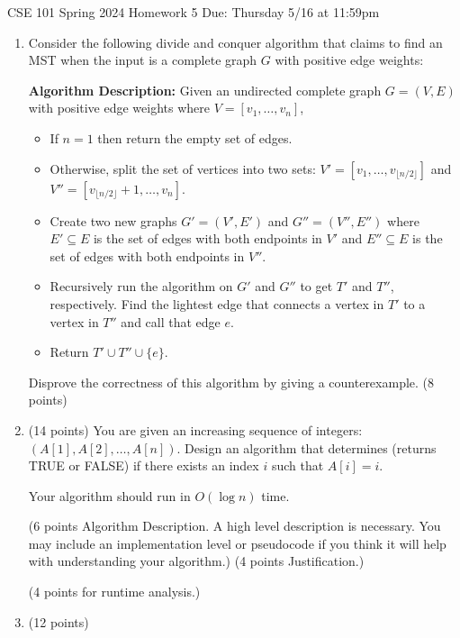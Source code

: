 \documentclass[10pt,letterpaper,unboxed,cm]{article}
\begin{document}
\hfill{CSE 101 Spring 2024}
\hfill{Homework 5 }
\hfill{Due: Thursday 5/16 at 11:59pm}






\begin{enumerate}

\item

Consider the following divide and conquer algorithm that claims to find an MST when the input is a complete graph $G$ with positive edge weights:

{\bf Algorithm Description:}
Given an undirected complete graph $G=(V,E)$ with positive edge weights where $V=[v_1,\dots,v_n]$,
\begin{itemize}
\item If $n=1$ then return the empty set of edges. 
\item
Otherwise, split the set of vertices into two sets: $V' = [v_1,\dots,v_{\lfloor n/2\rfloor}]$ and $V'' = [v_{\lfloor n/2\rfloor}+1,\dots,v_n]$.
\item
Create two new graphs $G' = (V',E')$ and $G'' = (V'',E'')$ where $E'\subseteq E$ is the set of edges with both endpoints in $V'$ and $E''\subseteq E$ is the set of edges with both endpoints in $V''$.
\item
Recursively run the algorithm on $G'$ and $G''$ to get $T'$ and $T''$, respectively. Find the lightest edge that connects a vertex in $T'$ to a vertex in $T''$ and call that edge $e$.
\item
Return $T' \cup T'' \cup \{e\}$.
\end{itemize}


Disprove the correctness of this algorithm by giving a counterexample.
(8 points)


\item (14 points) You are given an increasing sequence of integers: $(A[1],A[2],\dots,A[n])$. Design an algorithm that determines (returns TRUE or FALSE) if there exists an index $i$ such that $A[i]=i$.

Your algorithm should run in $O(\log n)$ time.




(6 points Algorithm Description. A high level description is necessary. You may
include an implementation level or pseudocode if you think it will help with understanding
your algorithm.) (4 points Justification.)

(4 points for runtime analysis.)


\item (12 points)


\end{enumerate}
\end{document}
